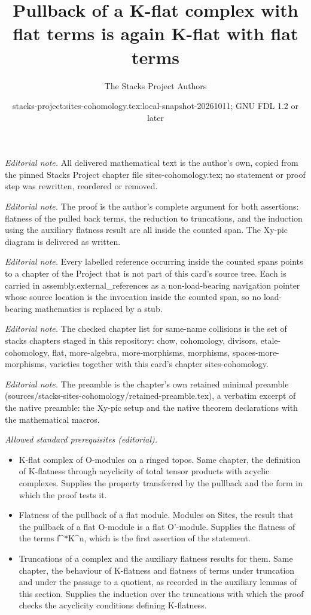 \documentclass[10pt,a4paper]{amsart}
\title{Pullback of a K-flat complex with flat terms is again K-flat with flat terms}
\author{The Stacks Project Authors}
\date{stacks-project:sites-cohomology.tex:local-snapshot-20261011; GNU FDL 1.2 or later}
\theoremstyle{plain}
\theoremstyle{definition}
\theoremstyle{remark}
\numberwithin{equation}{subsection}
\begin{document}
\maketitle
\noindent\textit{Editorial note.} All delivered mathematical text is the author's own, copied from the pinned Stacks Project chapter file sites-cohomology.tex; no statement or proof step was rewritten, reordered or removed.\par\medskip
\noindent\textit{Editorial note.} The proof is the author's complete argument for both assertions: flatness of the pulled back terms, the reduction to truncations, and the induction using the auxiliary flatness result are all inside the counted span. The Xy-pic diagram is delivered as written.\par\medskip
\noindent\textit{Editorial note.} Every labelled reference occurring inside the counted spans points to a chapter of the Project that is not part of this card's source tree. Each is carried in assembly.external\_references as a non-load-bearing navigation pointer whose source location is the invocation inside the counted span, so no load-bearing mathematics is replaced by a stub.\par\medskip
\noindent\textit{Editorial note.} The checked chapter list for same-name collisions is the set of stacks chapters staged in this repository: chow, cohomology, divisors, etale-cohomology, flat, more-algebra, more-morphisms, morphisms, spaces-more-morphisms, varieties together with this card's chapter sites-cohomology.\par\medskip
\noindent\textit{Editorial note.} The preamble is the chapter's own retained minimal preamble (sources/stacks-sites-cohomology/retained-preamble.tex), a verbatim excerpt of the native preamble: the Xy-pic setup and the native theorem declarations with the mathematical macros.\par\medskip
\noindent\textit{Allowed standard prerequisites (editorial).}\begin{itemize}
\item K-flat complex of O-modules on a ringed topos. Same chapter, the definition of K-flatness through acyclicity of total tensor products with acyclic complexes. Supplies the property transferred by the pullback and the form in which the proof tests it.
\item Flatness of the pullback of a flat module. Modules on Sites, the result that the pullback of a flat O-module is a flat O'-module. Supplies the flatness of the terms f\textasciicircum{}*K\textasciicircum{}n, which is the first assertion of the statement.
\item Truncations of a complex and the auxiliary flatness results for them. Same chapter, the behaviour of K-flatness and flatness of terms under truncation and under the passage to a quotient, as recorded in the auxiliary lemmas of this section. Supplies the induction over the truncations with which the proof checks the acyclicity conditions defining K-flatness.
\end{itemize}\medskip
\end{document}
